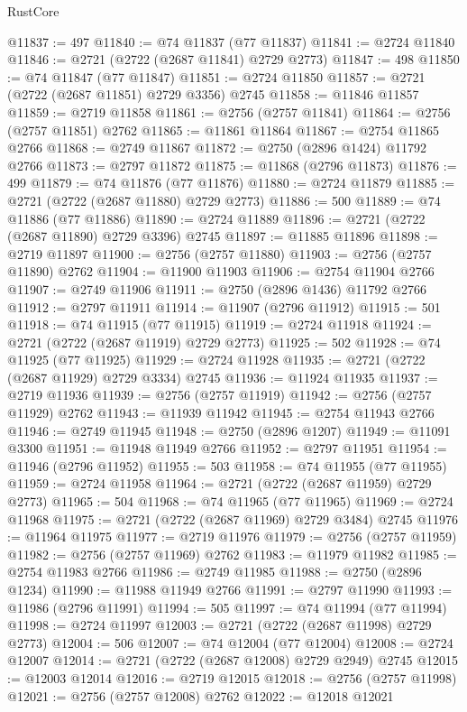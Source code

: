 \begin{lexlean}{RustCore}
\begin{coremodule}
@11837 := 497
@11840 := @74 @11837 (@77 @11837)
@11841 := @2724 @11840
@11846 := @2721 (@2722 (@2687 @11841) @2729 @2773)
@11847 := 498
@11850 := @74 @11847 (@77 @11847)
@11851 := @2724 @11850
@11857 := @2721 (@2722 (@2687 @11851) @2729 @3356) @2745
@11858 := @11846 @11857
@11859 := @2719 @11858
@11861 := @2756 (@2757 @11841)
@11864 := @2756 (@2757 @11851) @2762
@11865 := @11861 @11864
@11867 := @2754 @11865 @2766
@11868 := @2749 @11867
@11872 := @2750 (@2896 @1424) @11792 @2766
@11873 := @2797 @11872
@11875 := @11868 (@2796 @11873)
@11876 := 499
@11879 := @74 @11876 (@77 @11876)
@11880 := @2724 @11879
@11885 := @2721 (@2722 (@2687 @11880) @2729 @2773)
@11886 := 500
@11889 := @74 @11886 (@77 @11886)
@11890 := @2724 @11889
@11896 := @2721 (@2722 (@2687 @11890) @2729 @3396) @2745
@11897 := @11885 @11896
@11898 := @2719 @11897
@11900 := @2756 (@2757 @11880)
@11903 := @2756 (@2757 @11890) @2762
@11904 := @11900 @11903
@11906 := @2754 @11904 @2766
@11907 := @2749 @11906
@11911 := @2750 (@2896 @1436) @11792 @2766
@11912 := @2797 @11911
@11914 := @11907 (@2796 @11912)
@11915 := 501
@11918 := @74 @11915 (@77 @11915)
@11919 := @2724 @11918
@11924 := @2721 (@2722 (@2687 @11919) @2729 @2773)
@11925 := 502
@11928 := @74 @11925 (@77 @11925)
@11929 := @2724 @11928
@11935 := @2721 (@2722 (@2687 @11929) @2729 @3334) @2745
@11936 := @11924 @11935
@11937 := @2719 @11936
@11939 := @2756 (@2757 @11919)
@11942 := @2756 (@2757 @11929) @2762
@11943 := @11939 @11942
@11945 := @2754 @11943 @2766
@11946 := @2749 @11945
@11948 := @2750 (@2896 @1207)
@11949 := @11091 @3300
@11951 := @11948 @11949 @2766
@11952 := @2797 @11951
@11954 := @11946 (@2796 @11952)
@11955 := 503
@11958 := @74 @11955 (@77 @11955)
@11959 := @2724 @11958
@11964 := @2721 (@2722 (@2687 @11959) @2729 @2773)
@11965 := 504
@11968 := @74 @11965 (@77 @11965)
@11969 := @2724 @11968
@11975 := @2721 (@2722 (@2687 @11969) @2729 @3484) @2745
@11976 := @11964 @11975
@11977 := @2719 @11976
@11979 := @2756 (@2757 @11959)
@11982 := @2756 (@2757 @11969) @2762
@11983 := @11979 @11982
@11985 := @2754 @11983 @2766
@11986 := @2749 @11985
@11988 := @2750 (@2896 @1234)
@11990 := @11988 @11949 @2766
@11991 := @2797 @11990
@11993 := @11986 (@2796 @11991)
@11994 := 505
@11997 := @74 @11994 (@77 @11994)
@11998 := @2724 @11997
@12003 := @2721 (@2722 (@2687 @11998) @2729 @2773)
@12004 := 506
@12007 := @74 @12004 (@77 @12004)
@12008 := @2724 @12007
@12014 := @2721 (@2722 (@2687 @12008) @2729 @2949) @2745
@12015 := @12003 @12014
@12016 := @2719 @12015
@12018 := @2756 (@2757 @11998)
@12021 := @2756 (@2757 @12008) @2762
@12022 := @12018 @12021

\end{coremodule}
\end{lexlean}
